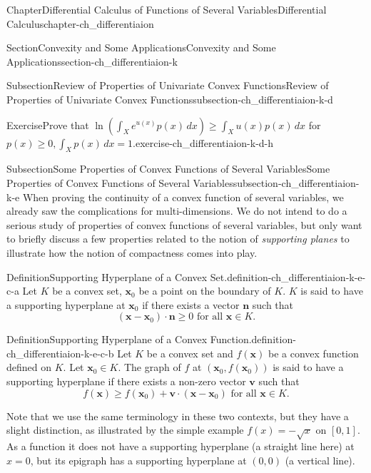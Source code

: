 \documentclass[oneside,10pt,]{book}
\numberwithin{equation}{section}
\begin{document}
\begin{chapterptx}{Chapter}{Differential Calculus of Functions of Several Variables}{}{Differential Calculus}{}{}{chapter-ch_differentiaion}
\begin{sectionptx}{Section}{Convexity and Some Applications}{}{Convexity and Some Applications}{}{}{section-ch_differentiaion-k}
\begin{subsectionptx}{Subsection}{Review of Properties  of Univariate Convex  Functions}{}{Review of Properties  of Univariate Convex  Functions}{}{}{subsection-ch_differentiaion-k-d}
\begin{inlineexercise}{Exercise}{Prove that \(\ln \left( \int_{X} e^{u(x)}p(x)\, dx\right) \ge
\int_{X} u(x)p(x)\, dx\) for \(p(x)\ge 0, \int_{X}p(x)\, dx=1\).}{exercise-ch_differentiaion-k-d-h}%
\end{inlineexercise}%
\end{subsectionptx}
%
%
\typeout{************************************************}
\typeout{************************************************}
%
\begin{subsectionptx}{Subsection}{Some Properties of Convex Functions of Several Variables}{}{Some Properties of Convex Functions of Several Variables}{}{}{subsection-ch_differentiaion-k-e}
When proving the continuity of a convex function of several variables, we already saw the complications for multi-dimensions. We do not intend to do a serious study of properties of convex functions of several variables, but only want to briefly discuss a few properties related to the notion of \emph{supporting planes} to illustrate how the notion of compactness comes into play.\begin{definition}{Definition}{Supporting Hyperplane of a Convex Set.}{definition-ch_differentiaion-k-e-c-a}%
Let \(K\) be a convex set, \(\mathbf x_{0}\) be a point on the boundary of \(K\). \(K\) is said to have a supporting hyperplane at \(\mathbf x_{0}\) if there exists a  vector \(\mathbf n\) such that%
\begin{equation*}
(\mathbf x - \mathbf x_{0})\cdot \mathbf n \ge 0 \text{ for all } \mathbf x \in K.
\end{equation*}
%
\end{definition}
 \begin{definition}{Definition}{Supporting Hyperplane of a Convex Function.}{definition-ch_differentiaion-k-e-c-b}%
Let \(K\) be a convex set and \(f(\mathbf x) \) be a convex function defined on \(K\). Let \(\mathbf x_{0}\in K\). The graph of \(f\) at \((\mathbf x_{0}, f(\mathbf x_{0}))\) is said to have a supporting hyperplane if there exists a non-zero vector \(\mathbf v\) such that%
\begin{equation*}
f(\mathbf x) \ge f(\mathbf x_{0}) +\mathbf v \cdot (\mathbf x- \mathbf x_{0}) \text{ for all }
\mathbf x \in K.
\end{equation*}
%
\end{definition}
 Note that we use the same terminology in these two contexts, but they have a slight distinction, as illustrated by the simple example \(f(x)=-\sqrt{x}\) on \([0, 1]\). As a function it does not have a supporting hyperplane (a straight line here) at \(x=0\), but its epigraph has a supporting hyperplane at \((0, 0)\) (a vertical line).%

\end{subsectionptx}
\end{sectionptx}
\end{chapterptx}
\end{document}
